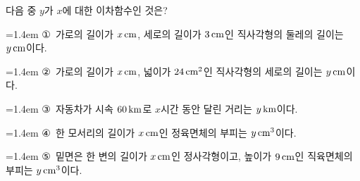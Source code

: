다음 중 $y$가 $x$에 대한 이차함수인 것은?
\par\medskip\par\noindent\hangindent=1.4em {\small ①}\ 가로의 길이가 $x\mkern3mu \mathrm{cm}$, 세로의 길이가 $3\mkern3mu \mathrm{cm}$인 직사각형의 둘레의 길이는 $y\mkern3mu \mathrm{cm}$이다.\par\noindent\hangindent=1.4em {\small ②}\ 가로의 길이가 $x\mkern3mu \mathrm{cm}$, 넓이가 $24\mkern3mu \mathrm{cm}^2$인 직사각형의 세로의 길이는 $y\mkern3mu \mathrm{cm}$이다.\par\noindent\hangindent=1.4em {\small ③}\ 자동차가 시속 $60\mkern3mu \mathrm{km}$로 $x$시간 동안 달린 거리는 $y\mkern3mu \mathrm{km}$이다.\par\noindent\hangindent=1.4em {\small ④}\ 한 모서리의 길이가 $x\mkern3mu \mathrm{cm}$인 정육면체의 부피는 $y\mkern3mu \mathrm{cm}^3$이다.\par\noindent\hangindent=1.4em {\small ⑤}\ 밑면은 한 변의 길이가 $x\mkern3mu \mathrm{cm}$인 정사각형이고, 높이가 $9\mkern3mu \mathrm{cm}$인 직육면체의 부피는 $y\mkern3mu \mathrm{cm}^3$이다.\par\medskip
